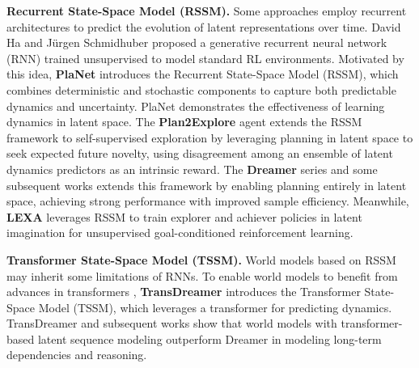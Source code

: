 \textbf{Recurrent State-Space Model (RSSM).} 
Some approaches employ recurrent architectures to predict the evolution of latent representations over time. David Ha and Jürgen Schmidhuber \cite{WorldModels,Recurrent_World_Models} proposed a generative recurrent neural network (RNN) trained unsupervised to model standard RL environments. Motivated by this idea, \textbf{PlaNet} \cite{PlaNet} introduces the Recurrent State-Space Model (RSSM), which combines deterministic and stochastic components to capture both predictable dynamics and uncertainty. PlaNet demonstrates the effectiveness of learning dynamics in latent space. The \textbf{Plan2Explore} \cite{Plan2Explore} agent extends the RSSM framework to self-supervised exploration by leveraging planning in latent space to seek expected future novelty, using disagreement among an ensemble of latent dynamics predictors as an intrinsic reward. The \textbf{Dreamer} series and some subsequent works \cite{Dreamer2, Dreamer3, Dreamer4, DreamerV3, DayDreamer, DreamerPro, Dreaming, DreamingV2, SafeDreamer, HarmonyDream, Dream_to_Generalize} extends this framework by enabling planning entirely in latent space, achieving strong performance with improved sample efficiency. Meanwhile, \textbf{LEXA} \cite{LEXA} leverages RSSM to train explorer and achiever policies in latent imagination for unsupervised goal-conditioned reinforcement learning.

\textbf{Transformer State-Space Model (TSSM).} 
World models based on RSSM may inherit some limitations of RNNs. To enable world models to benefit from advances in transformers \cite{Transformer}, \textbf{TransDreamer} \cite{TransDreamer} introduces the Transformer State-Space Model (TSSM), which leverages a transformer for predicting dynamics. TransDreamer and subsequent works \cite{Transformer_1, Transformer_2, STORM, IRIS} show that world models with transformer-based latent sequence modeling outperform Dreamer in modeling long-term dependencies and reasoning. 


